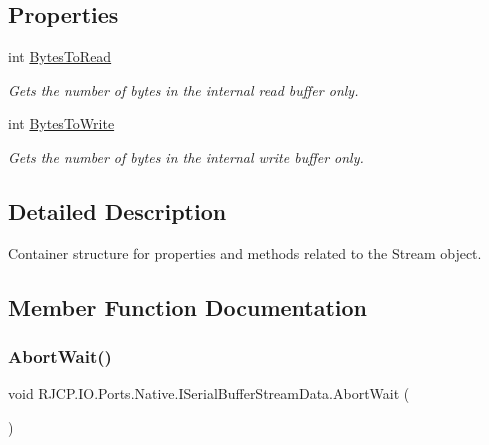 \subsection*{Properties}
\begin{DoxyCompactItemize}
\item 
int \mbox{\hyperlink{interface_r_j_c_p_1_1_i_o_1_1_ports_1_1_native_1_1_i_serial_buffer_stream_data_a7bee5da2f9b257cb316f992c43593738}{Bytes\+To\+Read}}
\begin{DoxyCompactList}\small\item\em Gets the number of bytes in the internal read buffer only. \end{DoxyCompactList}\item 
int \mbox{\hyperlink{interface_r_j_c_p_1_1_i_o_1_1_ports_1_1_native_1_1_i_serial_buffer_stream_data_a20b8a4c6adb372f23e6a609c513eca85}{Bytes\+To\+Write}}
\begin{DoxyCompactList}\small\item\em Gets the number of bytes in the internal write buffer only. \end{DoxyCompactList}\end{DoxyCompactItemize}


\subsection{Detailed Description}
Container structure for properties and methods related to the Stream object. 



\subsection{Member Function Documentation}
\mbox{\label{interface_r_j_c_p_1_1_i_o_1_1_ports_1_1_native_1_1_i_serial_buffer_stream_data_a3441575dd01e2111a5a66c593822f3f6}} 
\subsubsection{\texorpdfstring{AbortWait()}{AbortWait()}}
{\footnotesize\ttfamily void R\+J\+C\+P.\+I\+O.\+Ports.\+Native.\+I\+Serial\+Buffer\+Stream\+Data.\+Abort\+Wait (\begin{DoxyParamCaption}{ }\end{DoxyParamCaption})}



